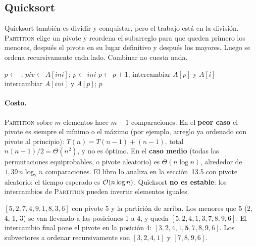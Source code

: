 \subsection{Quicksort}

Quicksort también es dividir y conquistar, pero el trabajo está en la división. \textsc{Partition} elige un pivote y reordena el subarreglo para que queden primero los menores, después el pivote en su lugar definitivo y después los mayores. Luego se ordena recursivamente cada lado. Combinar no cuesta nada.

\begin{algorithmic}[1]
    \State $p\gets$ 
    \State {};\; 
  \EndIf
\EndFunction
{} 
  \State $piv\gets A[ini]$;\; $p\gets ini$
     $p\gets p+1$;\; intercambiar $A[p]$ y $A[i]$ \EndIf
  \EndFor
  \State intercambiar $A[ini]$ y $A[p]$;\; \Return $p$
\EndFunction
\end{algorithmic}

\paragraph{Costo.} \textsc{Partition} sobre $m$ elementos hace $m-1$ comparaciones. En el \textbf{peor caso} el pivote es siempre el mínimo o el máximo (por ejemplo, arreglo ya ordenado con pivote al principio): $T(n)=T(n-1)+(n-1)$, total $n(n-1)/2=\Theta(n^2)$, y no es óptimo. En el \textbf{caso medio} (todas las permutaciones equiprobables, o pivote aleatorio) es $\Theta(n\log n)$, alrededor de $1{,}39\,n\log_2 n$ comparaciones. El libro lo analiza en la sección~13.5 con pivote aleatorio: el tiempo esperado es $\mathcal{O}(n\log n)$. Quicksort \textbf{no es estable}: los intercambios de \textsc{Partition} pueden invertir elementos iguales.

\begin{ejemplo}
$[5,2,7,4,9,1,8,3,6]$ con pivote 5 y la partición de arriba. Los menores que 5 (2, 4, 1, 3) se van llevando a las posiciones 1 a 4, y queda $[5,2,4,1,3,7,8,9,6]$. El intercambio final pone el pivote en la posición 4: $[3,2,4,1,\mathbf{5},7,8,9,6]$. Los subvectores a ordenar recursivamente son $[3,2,4,1]$ y $[7,8,9,6]$.
\end{ejemplo}

